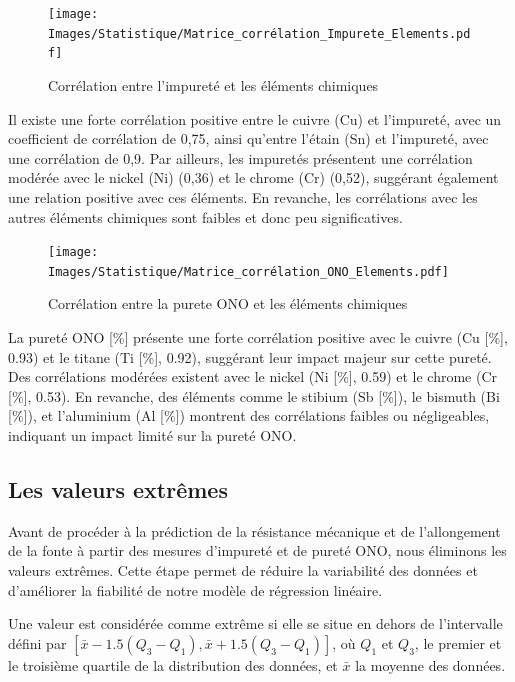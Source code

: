 \documentclass[12pt]{article}
\begin{document}
\begin{figure}[H]
    \texttt{[image: Images/Statistique/Matrice\_corrélation\_Impurete\_Elements.pdf]} 
    \caption{Corrélation entre l'impureté et les éléments chimiques}
    \label{fig:Corrélation2}
\end{figure}


Il existe une forte corrélation positive entre le cuivre (Cu) et 
l'impureté, avec un coefficient de corrélation de 0,75, ainsi 
qu'entre l'étain (Sn) et l'impureté, avec une corrélation de 0,9. 
Par ailleurs, les impuretés présentent une corrélation modérée avec le 
nickel (Ni) (0,36) et le chrome (Cr) (0,52), suggérant également une 
relation positive avec ces éléments. En revanche, les corrélations avec 
les autres éléments chimiques sont faibles et donc peu significatives.






\begin{figure}[H]
    \texttt{[image: Images/Statistique/Matrice\_corrélation\_ONO\_Elements.pdf]} 
    \caption{Corrélation entre la purete ONO et les éléments chimiques}
    \label{fig:Corrélation3}
\end{figure}

La pureté ONO [\%] présente une forte corrélation positive avec le cuivre 
(Cu [\%], 0.93) et le titane (Ti [\%], 0.92), suggérant leur impact majeur 
sur cette pureté. Des corrélations modérées existent avec le nickel 
(Ni [\%], 0.59) et le chrome (Cr [\%], 0.53). En revanche, des éléments 
comme le stibium (Sb [\%]), le bismuth (Bi [\%]), et l’aluminium (Al [\%]) 
montrent des corrélations faibles ou négligeables, indiquant un impact 
limité sur la pureté ONO.





\subsection{Les valeurs extrêmes}


Avant de procéder à la prédiction de la résistance mécanique et de 
l'allongement de la fonte à partir des mesures d'impureté et de pureté 
ONO, nous éliminons les valeurs extrêmes. Cette étape permet de réduire 
la variabilité des données et d'améliorer la fiabilité de notre modèle 
de régression linéaire.

Une valeur est considérée comme extrême si elle se situe en dehors de 
l'intervalle défini par 
$[\bar{x} - 1.5(Q_3 - Q_1), \bar{x} + 1.5(Q_3 - Q_1)]$, 
où $Q_1$ et $Q_3$, le premier et le troisième quartile 
de la distribution des données, et $\bar{x}$ la moyenne des données.
\end{document}
